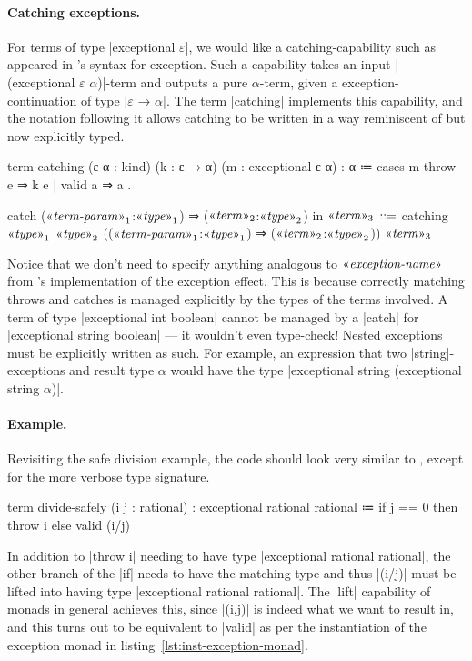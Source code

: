 \paragraph{Catching exceptions.}
For terms of type \code|exceptional $ε$|, we would like a catching-capability such as appeared in \LangB's syntax for exception.
Such a capability takes an input {\code|(exceptional $ε$ $α$)|-term} and outputs a pure $α$-term, given a exception-continuation of type \code|$ε$ → $α$|.
The term \code|catching| implements this capability, and the notation following it allows catching to be written in a way reminiscent of \LangB but now explicitly typed.
\begin{program}[caption={Definition of catching for exceptions}]
term catching (ε α : kind) (k : ε → α) (m : exceptional ε α) : α
  ≔ cases m
      { throw e ⇒ k e
      | valid a ⇒ a }.
\end{program}
%
\begin{notational}[caption={Notation of catching for exceptions}]
catch{ ($\mvar{term-param}_1$:$\mvar{type}_1$) ⇒ ($\mvar{term}_2$:$\mvar{type}_2$) } in $\mvar{term}_3$
  $\syneq$
    catching $\mvar{type}_1$ $\mvar{type}_2$ (($\mvar{term-param}_1$:$\mvar{type}_1$) ⇒ ($\mvar{term}_2$:$\mvar{type}_2$))
      $\mvar{term}_3$
\end{notational}
%
Notice that we don't need to specify anything analogous to $\mvar{exception-name}$ from \LangB's implementation of the exception effect.
This is because correctly matching throws and catches is managed explicitly by the types of the terms involved.
A term of type \code|exceptional int boolean| cannot be managed by a \code|catch| for \code|exceptional string boolean| --- it wouldn't even type-check!
Nested exceptions must be explicitly written as such.
For example, an expression that two \code|string|-exceptions and result type $α$ would have the type \code|exceptional string (exceptional string $α$)|.

\paragraph{Example.}
Revisiting the safe division example, the code should look very similar to \LangB, except for the more verbose type signature.
%
\begin{snippet}
term divide-safely (i j : rational)
  : exceptional rational rational
  ≔ if j == 0
      then throw i
      else valid (i/j)
\end{snippet}
%
In addition to \code|throw i| needing to have type \code|exceptional rational rational|,
the other branch of the \code|if| needs to have the matching type and thus \code|(i/j)| must be lifted into having type \code|exceptional rational rational|.
The \code|lift| capability of monads in general achieves this, since \code|(i,j)| is indeed what we want to result in, and this turns out to be equivalent to \code|valid| as per the instantiation of the exception monad in listing~\ref{lst:inst-exception-monad}.


